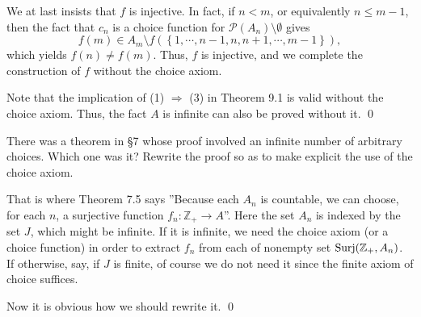 \documentclass[a4paper,12pt]{article}
\begin{document}
\begin{sol}
	We at last insists that \( f \) is injective.
	In fact,
	if
	\( n <m \),
	or equivalently
	\( n \le m-1 \),
	then the fact that \( c_n \) is a choice function for
	\( \mathcal{P}(A_n) \setminus \emptyset\) gives
	\begin{equation*}
		f(m)
		\in
		A_m \setminus f \left( \left\{ 1,\cdots,n-1,n,n+1,\cdots,m-1 \right\} \right),
	\end{equation*}
	which yields
	\( f(n) \neq f(m) \).
	Thus,
	\( f \)
	is injective,
	and we complete the construction of \( f \) without the choice axiom.
	
	Note that the implication of (1) \( \Rightarrow \) (3) in Theorem 9.1 is valid without the choice axiom.
	Thus, the fact \( A \) is infinite can also be proved without it.
	\qed\end{sol}

\begin{exe}
	There was a theorem in \S7 whose proof involved an infinite number of arbitrary choices.
	Which one was it?
	Rewrite the proof so as to make explicit the use of the choice axiom.
\end{exe}
\begin{sol}
	That is where Theorem 7.5 says
	''Because each \( A_n \) is countable,
	we can choose, for each \( n \),
	a surjective function \( f_n:\mathbb{Z}_{+} \to A \)''.
	Here the set \( A_n \) is indexed by the set \( J \),
	which might be infinite.
	If it is infinite, we need the choice axiom (or a choice function) in order to extract
	\( f_n \) from each of nonempty set \( \mathrm{Surj}(\mathbb{Z}_{+},A_n) \).
	If otherwise, say, if \( J \) is finite, of course we do not need it
	since the finite axiom of choice suffices.
	
	Now it is obvious how we should rewrite it.
	\qed\end{sol}
\end{document}
